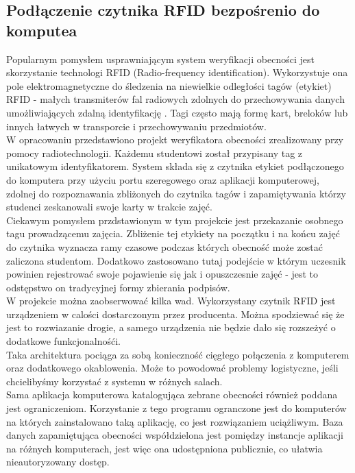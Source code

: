 \documentclass[declaration,shortabstract, mgr]{iithesis}
\begin{document}
\subsection{Podłączenie czytnika RFID bezpośrenio do komputea}
\indent Popularnym pomysłem usprawniającym system weryfikacji obecności jest skorzystanie technologi  RFID (Radio-frequency identification). Wykorzystuje ona pole elektromagnetyczne do śledzenia na niewielkie odległości tagów (etykiet) RFID - małych transmiterów fal radiowych zdolnych do przechowywania danych umożliwiających zdalną identyfikację \cite{rfid_itself}. Tagi często mają formę kart, breloków lub innych łatwych w transporcie i przechowywaniu przedmiotów.\\
\indent W opracowaniu \cite{rfid_serial} przedstawiono projekt weryfikatora obecności zrealizowany przy pomocy radiotechnologii. Każdemu studentowi został przypisany tag z unikatowym identyfikatorem. System składa się z czytnika etykiet podłączonego do komputera przy użyciu portu szeregowego oraz aplikacji komputerowej, zdolnej do rozpoznawania zbliżonych do czytnika tagów i zapamiętywania którzy studenci zeskanowali swoje karty w trakcie zajęć. \\
\indent Ciekawym pomysłem przdstawionym w tym projekcie jest przekazanie osobnego tagu prowadzącemu zajęcia. Zbliżenie tej etykiety na początku i na końcu zajęć do czytnika wyznacza ramy czasowe podczas których obecność może zostać zaliczona studentom. Dodatkowo zastosowano tutaj podejście w którym uczesnik powinien rejestrować swoje pojawienie się jak i opuszczesnie zajęć - jest to odstępstwo on tradycyjnej formy zbierania podpisów. \\
\indent W projekcie można zaobserwować kilka wad. Wykorzystany czytnik RFID jest urządzeniem w calości dostarczonym przez producenta. Można spodziewać się że jest to rozwiazanie drogie, a samego urządzenia nie będzie dało się rozszeżyć o dodatkowe funkcjonalnośći. \\
\indent Taka architektura pociąga za sobą konieczność cięgłego połączenia z komputerem oraz dodatkowego okablowenia. Może to  powodować problemy logistyczne, jeśli chcielibyśmy korzystać z systemu w różnych salach.\\
\indent Sama aplikacja komputerowa katalogująca zebrane obecności również poddana jest ograniczeniom. Korzystanie z tego programu ogranczone jest do komputerów na których zainstalowano taką aplikację, co jest rozwiązaniem uciążliwym. Baza danych zapamiętująca obecności współdzielona jest pomiędzy instancje aplikacji na różnych komputerach, jest więc ona udostępniona publicznie, co ułatwia nieautoryzowany dostęp.
\end{document}
